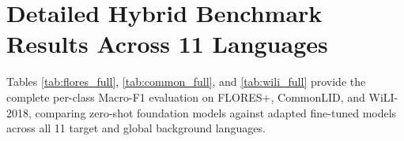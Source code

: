 \documentclass[11pt]{article}
\begin{document}


%
% 

\appendix
\section{Detailed Hybrid Benchmark Results Across 11 Languages}
\label{sec:appendix_tables}

Tables \ref{tab:flores_full}, \ref{tab:common_full}, and \ref{tab:wili_full} provide the complete per-class Macro-F1 evaluation on FLORES+, CommonLID, and WiLI-2018, comparing zero-shot foundation models against adapted fine-tuned models across all 11 target and global background languages.
\end{document}
